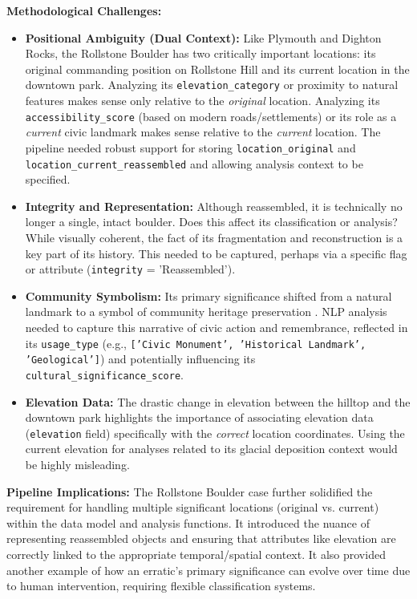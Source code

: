\textbf{Methodological Challenges:}
\begin{itemize}
    \item \textbf{Positional Ambiguity (Dual Context):} Like Plymouth and Dighton Rocks, the Rollstone Boulder has two critically important locations: its original commanding position on Rollstone Hill and its current location in the downtown park. Analyzing its \texttt{elevation\_category} or proximity to natural features makes sense only relative to the \emph{original} location. Analyzing its \texttt{accessibility\_score} (based on modern roads/settlements) or its role as a \emph{current} civic landmark makes sense relative to the \emph{current} location. The pipeline needed robust support for storing \texttt{location\_original} and \texttt{location\_current\_reassembled} and allowing analysis context to be specified.
    \item \textbf{Integrity and Representation:} Although reassembled, it is technically no longer a single, intact boulder. Does this affect its classification or analysis? While visually coherent, the fact of its fragmentation and reconstruction is a key part of its history. This needed to be captured, perhaps via a specific flag or attribute (\texttt{integrity} = 'Reassembled').
    \item \textbf{Community Symbolism:} Its primary significance shifted from a natural landmark to a symbol of community heritage preservation \cite{googleLewistonEvening}. NLP analysis needed to capture this narrative of civic action and remembrance, reflected in its \texttt{usage\_type} (e.g., \texttt{['Civic Monument', 'Historical Landmark', 'Geological']}) and potentially influencing its \texttt{cultural\_significance\_score}.
    \item \textbf{Elevation Data:} The drastic change in elevation between the hilltop and the downtown park highlights the importance of associating elevation data (\texttt{elevation} field) specifically with the \emph{correct} location coordinates. Using the current elevation for analyses related to its glacial deposition context would be highly misleading.
\end{itemize}

\textbf{Pipeline Implications:} The Rollstone Boulder case further solidified the requirement for handling multiple significant locations (original vs. current) within the data model and analysis functions. It introduced the nuance of representing reassembled objects and ensuring that attributes like elevation are correctly linked to the appropriate temporal/spatial context. It also provided another example of how an erratic's primary significance can evolve over time due to human intervention, requiring flexible classification systems.

